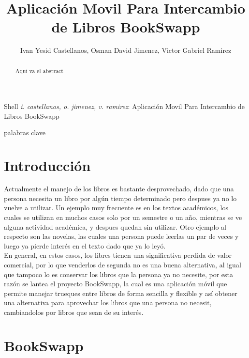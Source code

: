 \documentclass[]{IEEEtran}
\begin{document}
\title{Aplicación Movil Para Intercambio de Libros BookSwapp}
\author{Ivan Yesid Castellanos, Osman David Jimenez, Victor Gabriel Ramirez}

{Shell \MakeLowercase{\textit{I. Castellanos, O. Jimenez, V. Ramirez}}: Aplicación Movil Para Intercambio de Libros BookSwapp}

\maketitle

\begin{abstract}
Aqui va el abstract
\end{abstract}

\begin{IEEEkeywords}
	palabras clave
\end{IEEEkeywords}

\IEEEpeerreviewmaketitle

\section{Introducción}

Actualmente el manejo de los libros es bastante desprovechado, dado que una persona necesita un libro por algún tiempo determinado pero despues ya no lo vuelve a utilizar. Un ejemplo muy frecuente es en los textos académicos, los cuales se utilizan en muchos casos solo por un semestre o un año, mientras se ve alguna actividad académica, y despues quedan sin utilizar. Otro ejemplo al respecto son las novelas, las cuales una persona puede leerlas un par de veces y luego ya pierde interés en el texto dado que ya lo leyó.\\
En general, en estos casos, los libres tienen una significativa perdida de valor comercial, por lo que venderlos de segunda no es una buena alternativa, al igual que tampoco lo es conservar los libros que la persona ya no necesite, por esta razón se lantea el proyecto BookSwapp, la cual es una aplicación móvil que permite manejar trueques entre libros de forma sencilla y flexible y así obtener una alternativa para aprovechar los libros que una persona no necesit, cambiandolos por libros que sean de su interés.

\section{BookSwapp}
\end{document}
